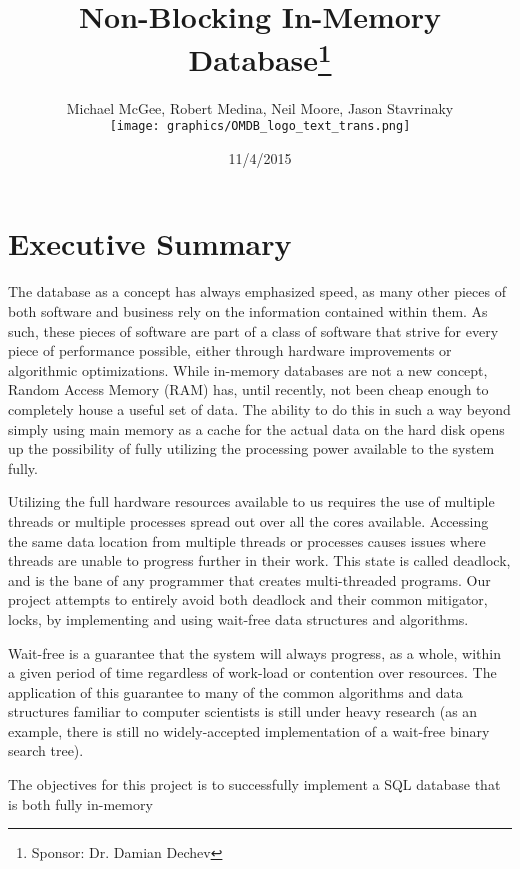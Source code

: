 \documentclass[letterpaper, 12pt]{article}
\title{Non-Blocking In-Memory Database\thanks{Sponsor: Dr. Damian Dechev}}
\author{Michael McGee, Robert Medina, Neil Moore, Jason Stavrinaky\\[1ex]
	\texttt{[image: graphics/OMDB\_logo\_text\_trans.png]}\\[1ex]
}
\date{11/4/2015}
\begin{document}
\maketitle
\newpage

\tableofcontents
\newpage


\section{Executive Summary}
The database as a concept has always emphasized speed, as many other pieces of both software
and business rely on the information contained within them. As such, these pieces of software
are part of a class of software that strive for every piece of performance possible, either through
hardware improvements or algorithmic optimizations. While in-memory databases are not a new concept,
Random Access Memory (RAM) has, until recently, not been cheap enough to completely house a useful
set of data. The ability to do this in such a way beyond simply using main memory as a cache for the
actual data on the hard disk opens up the possibility of fully utilizing the processing power
available to the system fully.
\par\vspace{\baselineskip}
Utilizing the full hardware resources available to us requires the use of multiple threads or
multiple processes spread out over all the cores available. Accessing the same data location
from multiple threads or processes causes issues where threads are unable to progress further in their
work. This state is called deadlock, and is the bane of any programmer that creates multi-threaded
programs. Our project attempts to entirely avoid both deadlock and their common mitigator, locks,
by implementing and using wait-free data structures and algorithms.
\par\vspace{\baselineskip}
Wait-free is a guarantee that the system will always progress, as a whole, within a given period of time
regardless of work-load or contention over resources. The application of this guarantee to many
of the common algorithms and data structures familiar to computer scientists is still under heavy research
(as an example, there is still no widely-accepted implementation of a wait-free binary search tree).
\par\vspace{\baselineskip}
The objectives for this project is to successfully implement a SQL database that is both fully in-memory
\end{document}

